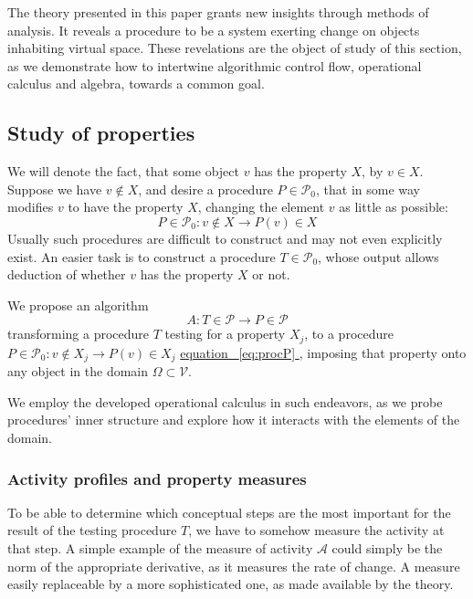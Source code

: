 \documentclass{article}
\makeatletter
\newcommand{\VV}{\mathcal{V}}
\newcommand{\dP}{\mathcal{P}}
\let\originaleqref\eqref %
\renewcommand{\eqref}[1]{%
  \begingroup%
  \let\ref\@refstar%
  \hyperref[#1]{%
    equation%
    ~\originaleqref{#1}%
  }%
  \endgroup
}
\makeatother
\begin{document}
   The theory presented in this paper grants new insights through methods of analysis. It reveals a procedure to be a system exerting change on objects inhabiting virtual space. These revelations are the object of study of this section, as we demonstrate how to intertwine algorithmic control flow, operational calculus and algebra, towards a common goal.  
  
  \subsection{Study of properties}
  
  We will denote the fact, that some object $v$ has the property $X$, by $v\in
  X$. Suppose we have $v\notin X$, and desire a procedure $P\in\dP_0$, that in
  some way modifies $v$ to have the property $X$, changing the element $v$ as
  little as possible: 
  \begin{equation}\label{eq:procP}
  P\in \dP_0:v\notin X\to P(v)\in X
  \end{equation}
  Usually such procedures are difficult to construct and may not even explicitly
  exist. An easier task is to construct a procedure $T\in\dP_0$, whose output
  allows deduction of whether $v$ has the property $X$ or not. 
  
   We propose an algorithm
   \begin{equation}\label{eq:algA}
     A:T\in\dP\to P\in\dP
     \end{equation}
     transforming a procedure $T$ testing for a property $X_j$, to a procedure
     $P\in \dP_0:v\notin X_j\to P(v)\in X_j$ \eqref{eq:procP}, imposing that
     property onto any object in the domain $\Omega\subset \VV$.
   
   We employ the developed operational calculus in such endeavors, as we probe
   procedures' inner structure and explore how it interacts with the elements of
   the domain.
 
\subsubsection{Activity profiles and property measures}
    
To be able to determine which conceptual steps are the most important for the
result of the testing procedure $T$, we have to somehow measure the activity
at that step. A simple example of the measure of activity $\mathcal{A}$ could simply be the norm of the
appropriate derivative, as it measures the rate of change. A measure easily replaceable by a more sophisticated one, as made available by the theory.
\end{document}
